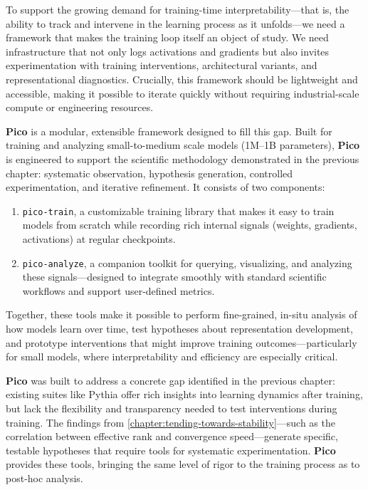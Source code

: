 To support the growing demand for training-time interpretability—that is, the ability to track and intervene in the learning process as it unfolds—we need a framework that makes the training loop itself an object of study. We need infrastructure that not only logs activations and gradients but also invites experimentation with training interventions, architectural variants, and representational diagnostics. Crucially, this framework should be lightweight and accessible, making it possible to iterate quickly without requiring industrial-scale compute or engineering resources.

\textbf{Pico} is a modular, extensible framework designed to fill this gap. Built for training and analyzing small-to-medium scale models (1M--1B parameters), \textbf{Pico} is engineered to support the scientific methodology demonstrated in the previous chapter: systematic observation, hypothesis generation, controlled experimentation, and iterative refinement. It consists of two components:

\begin{enumerate}
    \item \texttt{pico-train}, a customizable training library that makes it easy to train models from scratch while recording rich internal signals (weights, gradients, activations) at regular checkpoints.
    \item \texttt{pico-analyze}, a companion toolkit for querying, visualizing, and analyzing these signals—designed to integrate smoothly with standard scientific workflows and support user-defined metrics.
\end{enumerate}

Together, these tools make it possible to perform fine-grained, in-situ analysis of how models learn over time, test hypotheses about representation development, and prototype interventions that might improve training outcomes—particularly for small models, where interpretability and efficiency are especially critical.

\textbf{Pico} was built to address a concrete gap identified in the previous chapter: existing suites like Pythia offer rich insights into learning dynamics after training, but lack the flexibility and transparency needed to test interventions during training. The findings from \cref{chapter:tending-towards-stability}—such as the correlation between effective rank and convergence speed—generate specific, testable hypotheses that require tools for systematic experimentation. \textbf{Pico} provides these tools, bringing the same level of rigor to the training process as to post-hoc analysis.

